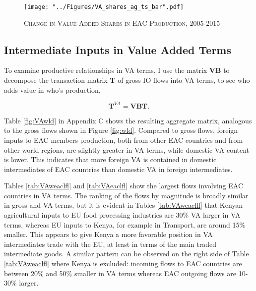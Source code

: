 \documentclass[a4paper]{article}
\begin{document}
\begin{figure}[h!]
\centering
\caption{\label{fig:EACVB_ts_bar}\textsc{Change in Value Added Shares in EAC Production, 2005-2015}}
\texttt{[image: "../Figures/VA\_shares\_ag\_ts\_bar".pdf]} %
\end{figure}
\FloatBarrier



\subsection{Intermediate Inputs in Value Added Terms}

To examine productive relationships in VA terms, I use the matrix \textbf{VB} to decompose the transaction matrix \textbf{T} of gross IO flows into VA terms, to see who adds value in who's production.  

\begin{equation}
\textbf{T}^{VA} = \textbf{VB} \textbf{T}.
\end{equation} 

Table \ref{fig:VAwld} in Appendix C shows the resulting aggregate matrix, analogous to the gross flows shown in Figure \ref{fig:wld}. Compared to gross flows, foreign inputs to EAC members production, both from other EAC countries and from other world regions, are slightly greater in VA terms, while domestic VA content is lower. This indicates that more foreign VA is contained in domestic intermediates of EAC countries than domestic VA in foreign intermediates. \newline

Tables \ref{tab:VAweaclfl} and \ref{tab:VAeaclfl} show the largest flows involving EAC countries in VA terms. The ranking of the flows by magnitude is broadly similar in gross and VA terms, but it is evident in Tables \ref{tab:VAweaclfl} that Kenyan agricultural inputs to EU food processing industries are 30\% VA larger in VA terms, whereas EU inputs to Kenya, for example in Transport, are around 15\% smaller. This appears to give Kenya a more favorable position in VA intermediates trade with the EU, at least in terms of the main traded intermediate goods. A similar pattern can be observed on the right side of Table \ref{tab:VAweaclfl} where Kenya is excluded: incoming flows to EAC countries are between 20\% and 50\% smaller in VA terms whereas EAC outgoing flows are 10-30\% larger.  
\end{document}
